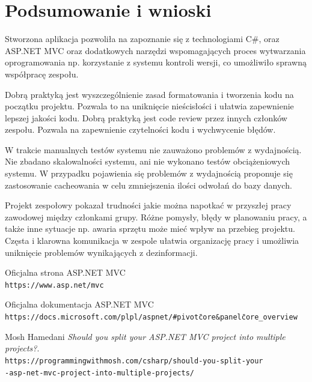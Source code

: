 \documentclass{article}
\begin{document}
\section{Podsumowanie i wnioski}

Stworzona aplikacja pozwoliła na zapoznanie się z technologiami C\#, oraz \\ ASP.NET MVC oraz dodatkowych narzędzi wspomagających proces wytwarzania oprogramowania np. korzystanie z systemu kontroli wersji, co umożliwiło sprawną współpracę zespołu.  

Dobrą praktyką jest wyszczególnienie zasad formatowania i tworzenia kodu na początku projektu. Pozwala to na uniknięcie nieścisłości i ułatwia zapewnienie lepszej jakości kodu. Dobrą praktyką jest code review przez innych członków zespołu. Pozwala na zapewnienie czytelności kodu i wychwycenie błędów. 

W trakcie manualnych testów systemu nie zauważono problemów z wydajnością. Nie zbadano skalowalności systemu, ani nie wykonano testów obciążeniowych systemu. W przypadku pojawienia się problemów z wydajnością proponuje się zastosowanie cacheowania w celu zmniejszenia ilości odwołań do bazy danych.

Projekt zespołowy pokazał trudności jakie można napotkać w przyszłej pracy zawodowej między członkami grupy. Różne pomysły, błędy w planowaniu pracy, a także inne sytuacje np. awaria sprzętu może mieć wpływ na przebieg projektu. Częsta i klarowna komunikacja w zespole ułatwia organizację pracy i umożliwia uniknięcie problemów wynikających z dezinformacji.


\newpage
\begin{thebibliography}{9}

Oficjalna strona ASP.NET MVC
\\\texttt{https://www.asp.net/mvc}

Oficjalna dokumentacja ASP.NET MVC
\\\texttt{https://docs.microsoft.com/pl\-pl/aspnet/\#pivot\=core\&panel\=core\_overview}

Mosh Hamedani
\textit{Should you split your ASP.NET MVC project into multiple projects?}.
\\\texttt{https://programmingwithmosh.com/csharp/should-you-split-your\\-asp-net-mvc-project-into-multiple-projects/}

\end{thebibliography}
\end{document}
